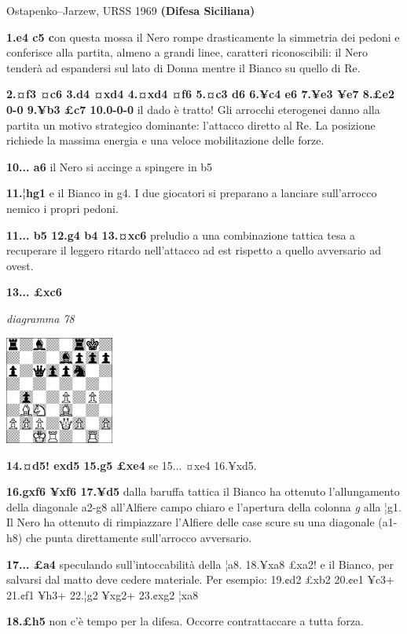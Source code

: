 \documentclass[
]{article}
\begin{document}
Ostapenko--Jarzew, URSS 1969 \textbf{(Difesa Siciliana)}

\textbf{1.e4 c5 c}on questa mossa il Nero rompe drasticamente la
simmetria dei pedoni e conferisce alla partita, almeno a grandi linee,
caratteri riconoscibili: il Nero tenderà ad espandersi sul lato di Donna
mentre il Bianco su quello di Re.

\textbf{2.¤f3 ¤c6 3.d4 ¤xd4 4.¤xd4 ¤f6 5.¤c3 d6 6.¥c4 e6 7.¥e3 ¥e7 8.£e2
0-0 9.¥b3 £c7 10.0-0-0} il dado è tratto! Gli arrocchi eterogenei danno
alla partita un motivo strategico dominante: l'attacco diretto al Re. La
posizione richiede la massima energia e una veloce mobilitazione delle
forze.

\textbf{10... a6} il Nero si accinge a spingere in b5

\textbf{11.¦hg1} e il Bianco in g4. I due giocatori si preparano a
lanciare sull'arrocco nemico i propri pedoni.

\textbf{11... b5 12.g4 b4 13.¤xc6} preludio a una combinazione tattica
tesa a recuperare il leggero ritardo nell'attacco ad est rispetto a
quello avversario ad ovest.

\textbf{13... £xc6}

\emph{diagramma 78}

\includegraphics[width=1.40139in,height=1.40139in]{vertopal_109f12be458a423d8f3cc838880eaea2/media/image78.png}

\textbf{14.¤d5! exd5 15.g5 £xe4} se 15... ¤xe4 16.¥xd5.

\textbf{16.gxf6 ¥xf6 17.¥d5} dalla baruffa tattica il Bianco ha ottenuto
l'allungamento della diagonale a2-g8 all'Alfiere campo chiaro e
l'apertura della colonna \emph{g} alla ¦g1. Il Nero ha ottenuto di
rimpiazzare l'Alfiere delle case scure su una diagonale (a1-h8) che
punta direttamente sull'arrocco avversario.

\textbf{17... £a4} speculando sull'intoccabilità della ¦a8. 18.¥xa8
£xa2! e il Bianco, per salvarsi dal matto deve cedere materiale. Per
esempio: 19.¢d2 £xb2 20.¢e1 ¥c3+ 21.¢f1 ¥h3+ 22.¦g2 ¥xg2+ 23.¢xg2 ¦xa8

\textbf{18.£h5} non c'è tempo per la difesa. Occorre contrattaccare a
tutta forza.
\end{document}
